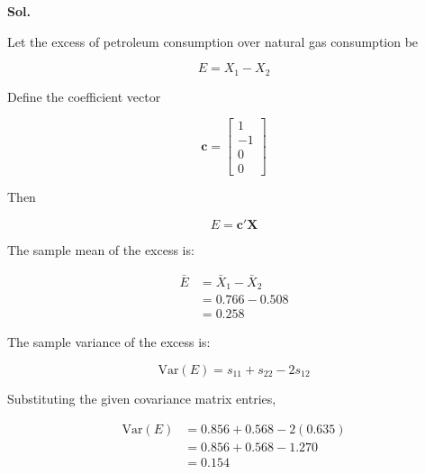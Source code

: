 \documentclass[12pt]{article}
\begin{document}
\vspace{0.2cm}

\textbf{Sol.}

\vspace{0.2cm}

Let the excess of petroleum consumption over natural gas consumption be

\vspace{0.2cm}

\[
E = X_1 - X_2
\]

\vspace{0.2cm}

Define the coefficient vector

\vspace{0.2cm}

\[
\mathbf{c} = \begin{bmatrix}
1 \\
-1 \\
0 \\
0
\end{bmatrix}
\]

\vspace{0.2cm}

Then

\vspace{0.2cm}

\[
E = \mathbf{c}'\mathbf{X}
\]

\vspace{0.2cm}

The sample mean of the excess is:


\begin{align*}
\bar{E} &= \bar{X}_1 - \bar{X}_2 \\
&= 0.766 - 0.508 \\
&= \boxed{0.258}
\end{align*}

\vspace{0.2cm}

The sample variance of the excess is:

\vspace{0.2cm}

\[
\text{Var}(E) = s_{11} + s_{22} - 2s_{12}
\]

\vspace{0.2cm}

Substituting the given covariance matrix entries,

\vspace{0.2cm}

\begin{align*}
\text{Var}(E) &= 0.856 + 0.568 - 2(0.635) \\
&= 0.856 + 0.568 - 1.270 \\
&= \boxed{0.154}
\end{align*}
\end{document}
